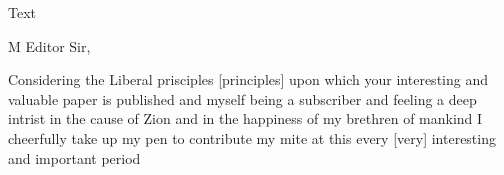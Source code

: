 			\begin{description}
				\item[Text]
			\end{description}
			
				
				M Editor Sir,
				
				Considering the Liberal prisciples [principles] upon which your interesting and valuable paper is published and myself being a subscriber and feeling a deep intrist in the cause of Zion and in the happiness of my brethren of mankind I cheerfully take up my pen to contribute my mite at this every [very] interesting and important period
				
